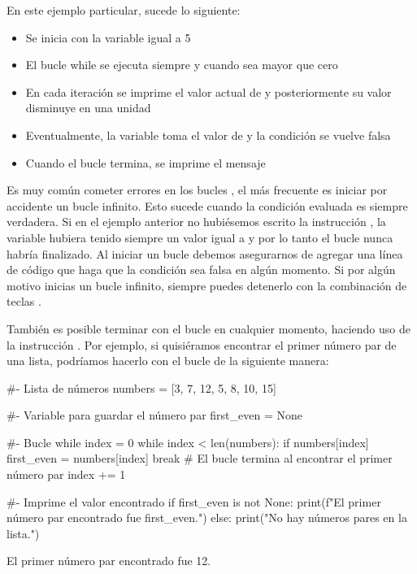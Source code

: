 En este ejemplo particular, sucede lo siguiente:
\begin{itemize}
    \item Se inicia con la variable  igual a 5
    \item El bucle while se ejecuta siempre y cuando  sea mayor que cero
    \item En cada iteración se imprime el valor actual de  y posteriormente su valor disminuye en una unidad
    \item Eventualmente, la variable  toma el valor de  y la condición se vuelve falsa
    \item Cuando el bucle termina, se imprime el mensaje 
\end{itemize}

Es muy común cometer errores en los bucles , el más frecuente es iniciar por accidente un bucle infinito. Esto sucede cuando la condición evaluada es siempre verdadera. Si en el ejemplo anterior no hubiésemos escrito la instrucción , la variable  hubiera tenido siempre un valor igual a  y por lo tanto el bucle nunca habría finalizado. Al iniciar un bucle  debemos asegurarnos de agregar una línea de código que haga que la condición sea falsa en algún momento. Si por algún motivo inicias un bucle infinito, siempre puedes detenerlo con la combinación de teclas .

También es posible terminar con el bucle  en cualquier momento, haciendo uso de la instrucción . Por ejemplo, si quisiéramos encontrar el primer número par de una lista, podríamos hacerlo con el bucle  de la siguiente manera:

\begin{pyin}[]
#- Lista de números
numbers = [3, 7, 12, 5, 8, 10, 15]

#- Variable para guardar el número par
first_even = None

#- Bucle while 
index = 0
while index < len(numbers):
    if numbers[index] %
        first_even = numbers[index]
        break  # El bucle termina al encontrar el primer número par
    index += 1

#- Imprime el valor encontrado
if first_even is not None:
    print(f"El primer número par encontrado fue {first_even}.")
else:
    print("No hay números pares en la lista.")
\end{pyin}
\begin{pyout}
El primer número par encontrado fue 12.
\end{pyout}

